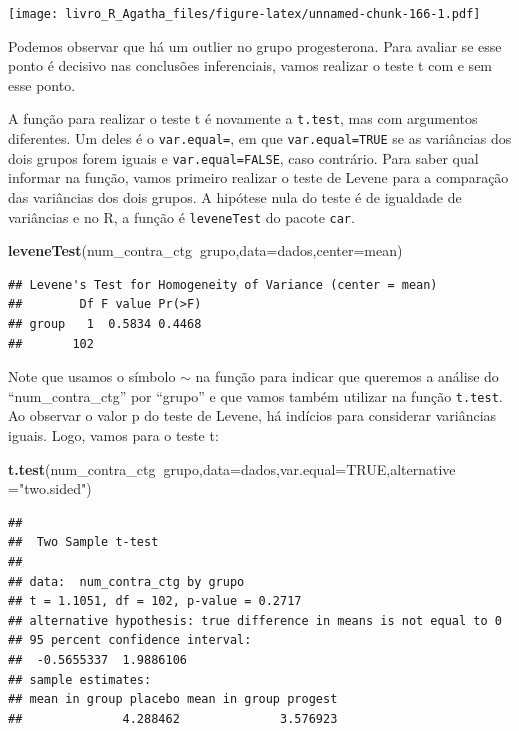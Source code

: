 \documentclass[
]{book}
\newenvironment{Shaded}{\begin{snugshade}}{\end{snugshade}}
\newcommand{\DataTypeTok}[1]{\textcolor[rgb]{0.13,0.29,0.53}{#1}}
\newcommand{\KeywordTok}[1]{\textcolor[rgb]{0.13,0.29,0.53}{\textbf{#1}}}
\newcommand{\NormalTok}[1]{#1}
\newcommand{\OperatorTok}[1]{\textcolor[rgb]{0.81,0.36,0.00}{\textbf{#1}}}
\newcommand{\OtherTok}[1]{\textcolor[rgb]{0.56,0.35,0.01}{#1}}
\newcommand{\StringTok}[1]{\textcolor[rgb]{0.31,0.60,0.02}{#1}}
\begin{document}
\texttt{[image: livro\_R\_Agatha\_files/figure-latex/unnamed-chunk-166-1.pdf]}

Podemos observar que há um outlier no grupo progesterona. Para avaliar se esse ponto é decisivo nas conclusões inferenciais, vamos realizar o teste t com e sem esse ponto.

A função para realizar o teste t é novamente a \texttt{t.test}, mas com argumentos diferentes. Um deles é o \texttt{var.equal=}, em que \texttt{var.equal=TRUE} se as variâncias dos dois grupos forem iguais e \texttt{var.equal=FALSE}, caso contrário. Para saber qual informar na função, vamos primeiro realizar o teste de Levene para a comparação das variâncias dos dois grupos. A hipótese nula do teste é de igualdade de variâncias e no R, a função é \texttt{leveneTest} do pacote \texttt{car}.

\begin{Shaded}
\begin{Highlighting}[]
\KeywordTok{leveneTest}\NormalTok{(num_contra_ctg}\OperatorTok{~}\NormalTok{grupo,}\DataTypeTok{data=}\NormalTok{dados,}\DataTypeTok{center=}\NormalTok{mean) }
\end{Highlighting}
\end{Shaded}

\begin{verbatim}
## Levene's Test for Homogeneity of Variance (center = mean)
##        Df F value Pr(>F)
## group   1  0.5834 0.4468
##       102
\end{verbatim}

Note que usamos o símbolo \(\sim\) na função para indicar que queremos a análise do ``num\_contra\_ctg'' por ``grupo'' e que vamos também utilizar na função \texttt{t.test}. Ao observar o valor p do teste de Levene, há indícios para considerar variâncias iguais. Logo, vamos para o teste t:

\begin{Shaded}
\begin{Highlighting}[]
\KeywordTok{t.test}\NormalTok{(num_contra_ctg}\OperatorTok{~}\NormalTok{grupo,}\DataTypeTok{data=}\NormalTok{dados,}\DataTypeTok{var.equal=}\OtherTok{TRUE}\NormalTok{,}\DataTypeTok{alternative =}\StringTok{"two.sided"}\NormalTok{)}
\end{Highlighting}
\end{Shaded}

\begin{verbatim}
## 
## 	Two Sample t-test
## 
## data:  num_contra_ctg by grupo
## t = 1.1051, df = 102, p-value = 0.2717
## alternative hypothesis: true difference in means is not equal to 0
## 95 percent confidence interval:
##  -0.5655337  1.9886106
## sample estimates:
## mean in group placebo mean in group progest 
##              4.288462              3.576923
\end{verbatim}
\end{document}
